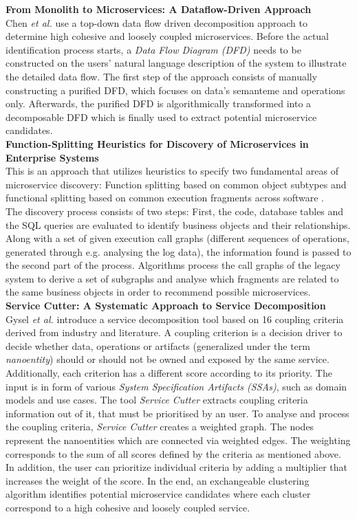 \noindent
\textbf{From Monolith to Microservices: A Dataflow-Driven Approach } \\
Chen \textit{et al.} \cite{DataflowDrivenChen} use a top-down data flow driven decomposition approach to determine high cohesive and loosely coupled microservices. Before the actual identification process starts, a \textit{Data Flow Diagram (DFD)} needs to be constructed on the users' natural language description of the system to illustrate the detailed data flow. The first step of the approach consists of manually constructing a purified DFD, which focuses on data's semanteme and operations only. Afterwards, the purified DFD is algorithmically transformed into a decomposable DFD which is finally used to extract potential microservice candidates. \\


\noindent
\textbf{Function-Splitting Heuristics for Discovery of Microservices in Enterprise Systems  } \\
This is an approach that utilizes heuristics to specify two fundamental areas of microservice discovery: Function splitting based on common object subtypes and functional splitting based on common execution fragments across software \cite{HeuristicsAlwis}. \\
The discovery process consists of two steps: First, the code, database tables and the SQL queries are evaluated to identify business objects and their relationships. Along with a set of given execution call graphs (different sequences of operations, generated through e.g. analysing the log data), the information found is passed to the second part of the process. Algorithms process the call graphs of the legacy system to derive a set of subgraphs and analyse which fragments are related to the same business objects in order to recommend possible microservices. \\

\noindent
\textbf{Service Cutter: A Systematic Approach to Service Decomposition  } \\
Gysel \textit{et al.} \cite{ServiceCutter} introduce a service decomposition tool based on 16 coupling criteria derived from industry and literature. A coupling criterion is a decision driver to decide whether data, operations or artifacts (generalized under the term \textit{nanoentity}) should or should not be owned and exposed by the same service. Additionally, each criterion has a different score according to its priority.
The input is in form of various \textit{System Specification Artifacts (SSAs)}, such as domain models and use cases.  The tool \textit{Service Cutter} extracts coupling criteria information out of it, that must be prioritised by an user. To analyse and process the coupling criteria, \textit{Service Cutter} creates a weighted graph. The nodes represent the nanoentities which are connected via weighted edges. The weighting corresponds to the sum of all scores defined by the criteria as mentioned above. In addition, the user can prioritize individual criteria by adding a multiplier that increases the weight of the score. In the end, an exchangeable clustering algorithm identifies potential microservice candidates where each cluster correspond to a high cohesive and loosely coupled service.
 
